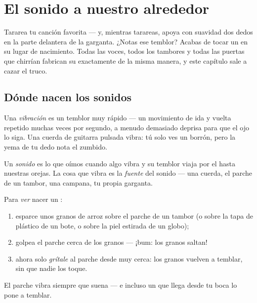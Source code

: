 \chapter{El sonido a nuestro alrededor}\label{ch:g3:sound-around-us}

Tararea tu canción favorita --- y, mientras tarareas, apoya con
suavidad dos dedos en la parte delantera de la garganta. ¿Notas ese
temblor? Acabas de tocar un  en su lugar de nacimiento. Todas
las voces, todos los tambores y todas las puertas que chirrían
fabrican su  exactamente de la misma manera, y este capítulo sale
a cazar el truco.

\section{Dónde nacen los sonidos}

\begin{definition}[Vibración]\label{def:g3:sound-around-us:vibration}
Una \emph{vibración} es un temblor muy rápido --- un
movimiento de ida y vuelta repetido muchas veces por segundo, a menudo
demasiado deprisa para que el ojo lo siga. Una cuerda de guitarra
pulsada vibra: tú solo ves un borrón, pero la yema de tu dedo nota el
zumbido.
\end{definition}

\begin{definition}[Sonido]\label{def:g3:sound-around-us:sound}
Un \emph{sonido} es lo que oímos cuando algo vibra y su
temblor viaja por el  hasta nuestras orejas. La cosa que vibra es
la \emph{fuente} del sonido --- una cuerda, el parche de un tambor,
una campana, tu propia garganta.
\end{definition}

\begin{method}\label{met:g3:sound-around-us:rice}
Para \emph{ver} nacer un :
\begin{enumerate}
  \item esparce unos granos de arroz sobre el parche de un tambor (o
        sobre la tapa de plástico de un bote, o sobre la piel estirada
        de un globo);
  \item golpea el parche cerca de los granos --- ¡bum: los granos
        saltan!
  \item ahora solo \emph{grítale} al parche desde muy cerca: los
        granos vuelven a temblar, sin que nadie los toque.
\end{enumerate}
El parche vibra siempre que suena --- e incluso un  que llega
desde tu boca lo pone a temblar.
\end{method}

